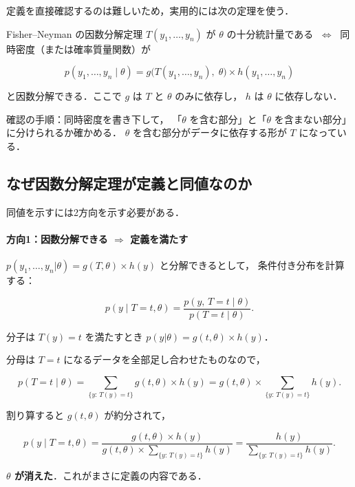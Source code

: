 \documentclass[lualatex,ja=standard,a4paper,12pt]{bxjsarticle}
\begin{document}
定義を直接確認するのは難しいため，実用的には次の定理を使う．

\begin{thmbox}{Fisher--Neyman の因数分解定理}
$T(y_1,\ldots,y_n)$ が $\theta$ の十分統計量である
$\;\Longleftrightarrow\;$ 同時密度（または確率質量関数）が

\[
  p(y_1,\ldots,y_n \mid \theta)
  = g\!\bigl(T(y_1,\ldots,y_n),\; \theta\bigr) \times h(y_1,\ldots,y_n)
\]

と因数分解できる．ここで $g$ は $T$ と $\theta$ のみに依存し，
$h$ は $\theta$ に依存しない．
\end{thmbox}

\begin{pointbox}
確認の手順：同時密度を書き下して，
「$\theta$ を含む部分」と「$\theta$ を含まない部分」に分けられるか確かめる．
$\theta$ を含む部分がデータに依存する形が $T$ になっている．
\end{pointbox}

\subsection*{なぜ因数分解定理が定義と同値なのか}

同値を示すには2方向を示す必要がある．

\paragraph{方向1：因数分解できる $\Rightarrow$ 定義を満たす}

$p(y_1,\ldots,y_n|\theta) = g(T,\theta) \times h(y)$ と分解できるとして，
条件付き分布を計算する：

\[
  p(y \mid T=t, \theta)
  = \frac{p(y,\, T=t \mid \theta)}{p(T=t \mid \theta)}.
\]

分子は $T(y)=t$ を満たすとき $p(y|\theta) = g(t,\theta) \times h(y)$．

分母は $T=t$ になるデータを全部足し合わせたものなので，

\[
  p(T=t \mid \theta)
  = \sum_{\{y:\,T(y)=t\}} g(t,\theta) \times h(y)
  = g(t,\theta) \times \sum_{\{y:\,T(y)=t\}} h(y).
\]

割り算すると $g(t,\theta)$ が約分されて，

\[
  p(y \mid T=t, \theta)
  = \frac{g(t,\theta) \times h(y)}{g(t,\theta) \times \displaystyle\sum_{\{y:\,T(y)=t\}} h(y)}
  = \frac{h(y)}{\displaystyle\sum_{\{y:\,T(y)=t\}} h(y)}.
\]

\textbf{$\theta$ が消えた}．これがまさに定義の内容である．
\end{document}
